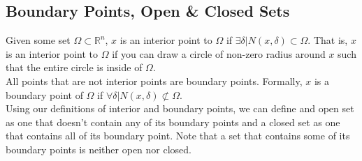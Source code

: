 \subsection{Boundary Points, Open \& Closed Sets}
\noindent
Given some set $\Omega\subset\mathbb{R}^n$, $x$ is an interior point to $\Omega$ if $\exists\delta |N(x,\delta)\subset\Omega$. That is, $x$ is an interior point to $\Omega$ if you can draw a circle of non-zero radius around $x$ such that the entire circle is inside of $\Omega$.\\
All points that are not interior points are boundary points. Formally, $x$ is a boundary point of $\Omega$ if $\forall\delta |N(x,\delta)\not\subset\Omega$.\\
Using our definitions of interior and boundary points, we can define and open set as one that doesn't contain any of its boundary points and a closed set as one that contains all of its boundary point. Note that a set that contains some of its boundary points is neither open nor closed.